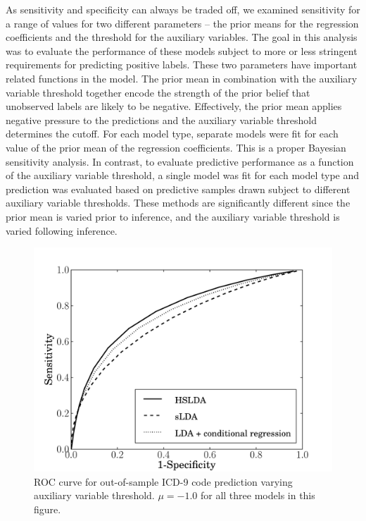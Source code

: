 As sensitivity and specificity can always be traded off, we examined
sensitivity for a range of values for two different parameters -- the prior
means for the regression coefficients and the threshold for the auxiliary
variables.  The goal in this analysis was to evaluate the performance of these
models subject to more or less stringent requirements for predicting positive
labels. These two parameters have important related functions in the model. The
prior mean in combination with the auxiliary variable threshold together encode
the strength of the prior belief that unobserved labels are likely to be
negative. Effectively, the prior mean applies negative pressure to the
predictions and the auxiliary variable threshold determines the cutoff. 
For each model type, separate models were fit for each value of the 
prior mean of the regression coefficients.  This is a proper Bayesian
sensitivity analysis. In contrast, to evaluate
predictive performance as a function of the auxiliary variable threshold,
a single model was fit for each model type and prediction was evaluated
based on predictive samples drawn subject to different auxiliary variable
thresholds. These methods are significantly different since the prior mean
is varied prior to inference, and the auxiliary variable threshold is varied
following inference.

\begin{figure}[t]
\centering \includegraphics[scale=0.4]{Chapters/chapter1/figs/ROC_comparison_leafs} \caption{ROC curve for out-of-sample ICD-9 code prediction varying auxiliary variable threshold. $\mu = -1.0$ for all three models in this figure.}
\label{fig:results_auxiliary_var} 
\end{figure}


